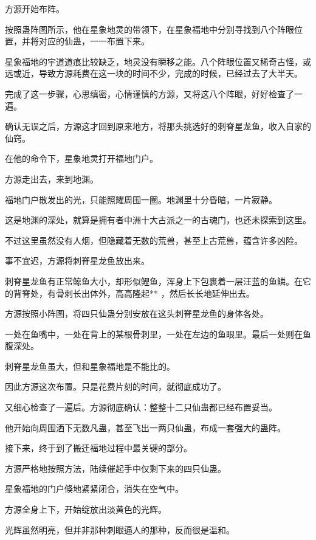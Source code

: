 
\begin{this_body}

方源开始布阵。

按照蛊阵图所示，他在星象地灵的带领下，在星象福地中分别寻找到八个阵眼位置，并将对应的仙蛊，一一布置下来。

星象福地的宇道道痕比较缺乏，地灵没有瞬移之能。八个阵眼位置又稀奇古怪，或远或近，导致方源耗费在这一块的时间不少，完成的时候，已经过去了大半天。

完成了这一步骤，心思缜密，心情谨慎的方源，又将这八个阵眼，好好检查了一遍。

确认无误之后，方源这才回到原来地方，将那头挑选好的刺脊星龙鱼，收入自家的仙窍。

在他的命令下，星象地灵打开福地门户。

方源走出去，来到地渊。

福地门户散发出的光，只能照耀周围一圈。地渊里十分昏暗，一片寂静。

这是地渊的深处，就算是拥有者中洲十大古派之一的古魂门，也还未探索到这里。

不过这里虽然没有人烟，但隐藏着无数的荒兽，甚至上古荒兽，蕴含许多凶险。

事不宜迟，方源将刺脊星龙鱼放出来。

刺脊星龙鱼有正常鲸鱼大小，却形似鲤鱼，浑身上下包裹着一层汪蓝的鱼鳞。在它的背脊处，有骨刺长出体外，高高隆起** ，然后长长地延伸出去。

方源按照小阵图，将四只仙蛊分别安放在这头刺脊星龙鱼的身体各处。

一处在鱼嘴中，一处在背上的某根骨刺里，一处在左边的鱼眼里。最后一处则在鱼腹深处。

刺脊星龙鱼虽大，但和星象福地是不能比的。

因此方源这次布置。只是花费片刻的时间，就彻底成功了。

又细心检查了一遍后。方源彻底确认：整整十二只仙蛊都已经布置妥当。

他开始向周围洒下无数凡蛊，甚至飞出一两只仙蛊，布成一套强大的蛊阵。

接下来，终于到了搬迁福地过程中最关键的部分。

方源严格地按照方法，陆续催起手中仅剩下来的四只仙蛊。

星象福地的门户倏地紧紧闭合，消失在空气中。

方源全身上下，开始绽放出淡黄色的光辉。

光辉虽然明亮，但并非那种刺眼逼人的那种，反而很是温和。


\end{this_body}
